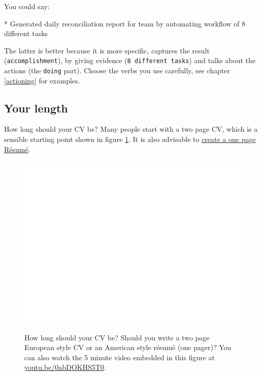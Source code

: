 \documentclass[
]{book}
\newenvironment{Shaded}{\begin{snugshade}}{\end{snugshade}}
\newcommand{\NormalTok}[1]{#1}
\newcommand{\SpecialStringTok}[1]{\textcolor[rgb]{0.31,0.60,0.02}{#1}}
\begin{document}
You could say:

\begin{Shaded}
\begin{Highlighting}[]
\SpecialStringTok{* }\NormalTok{Generated daily reconciliation report for team by automating workflow of 8 different tasks}
\end{Highlighting}
\end{Shaded}

The latter is better because it is more specific, captures the result (\texttt{accomplishment}), by giving evidence (\texttt{8\ different\ tasks}) and talks about the actions (the \texttt{doing} part). Choose the verbs you use carefully, see chapter \ref{actioning} for examples.

\hypertarget{length}{%
\subsection{Your length}\label{length}}

How long should your CV be? Many people start with a two page CV, which is a sensible starting point shown in figure \ref{fig:oneortwopager-fig}. It is also advisable to \href{https://www.cv-library.co.uk/career-advice/cv/how-long-cv-be/}{create a one page Résumé}. \citep{howlong}

\begin{figure}

{\centering \href{https://www.youtube.com/embed/0abDOKHS5T0}{\includegraphics[width=0.99\linewidth]{cdyf_files/figure-latex/oneortwopager-fig-1} }

}

\caption{How long should your CV be? Should you write a two page European style CV or an American style résumé (one pager)? You can also watch the 5 minute video embedded in this figure at \href{https://youtu.be/0abDOKHS5T0}{youtu.be/0abDOKHS5T0}. \citep{youtube-resume-or-cv}}\label{fig:oneortwopager-fig}
\end{figure}
\end{document}
